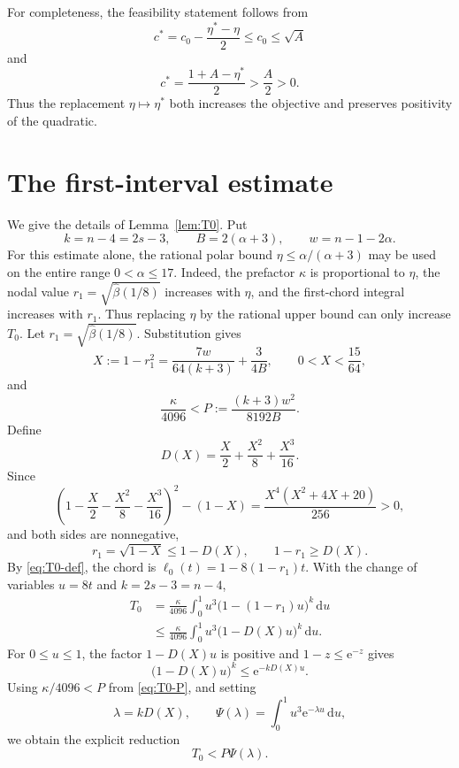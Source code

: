 \documentclass[11pt]{amsart}
\theoremstyle{definition}
\newcommand{\dd}{\,\mathrm d}
\newcommand{\e}{\mathrm e}
\newcommand{\etaStar}{\eta^{\ast}}
\newcommand{\betaHat}{\widehat\beta}
\begin{document}
For completeness, the feasibility statement follows from
\[
 c^{\ast}=c_0-\frac{\etaStar-\eta}{2}\le c_0\le\sqrt A
\]
and
\[
 c^{\ast}=\frac{1+A-\etaStar}{2}>\frac A2>0.
\]
Thus the replacement $\eta\mapsto\etaStar$ both increases the objective and preserves positivity of the quadratic.

\section{The first-interval estimate}\label{app:T0}

We give the details of Lemma~\ref{lem:T0}.  Put
\[
 k=n-4=2s-3,
 \qquad
 B=2(\alpha+3),
 \qquad
 w=n-1-2\alpha.
\]
For this estimate alone, the rational polar bound $\eta\le\alpha/(\alpha+3)$ may be used on the entire range $0<\alpha\le17$.  Indeed, the prefactor $\kappa$ is proportional to $\eta$, the nodal value $r_1=\sqrt{\betaHat(1/8)}$ increases with $\eta$, and the first-chord integral increases with $r_1$.  Thus replacing $\eta$ by the rational upper bound can only increase $T_0$.
Let $r_1=\sqrt{\betaHat(1/8)}$.  Substitution gives
\begin{equation}\label{eq:T0-X}
 X:=1-r_1^2
 =\frac{7w}{64(k+3)}+\frac3{4B},
 \qquad 0<X<\frac{15}{64},
\end{equation}
and
\begin{equation}\label{eq:T0-P}
 \frac\kappa{4096}
 <P:=\frac{(k+3)w^2}{8192B}.
\end{equation}
Define
\[
 D(X)=\frac X2+\frac{X^2}{8}+\frac{X^3}{16}.
\]
Since
\[
 \left(1-\frac X2-\frac{X^2}{8}-\frac{X^3}{16}\right)^2-(1-X)
 =\frac{X^4(X^2+4X+20)}{256}>0,
\]
and both sides are nonnegative,
\[
 r_1=\sqrt{1-X}
 \le 1-D(X),
 \qquad
 1-r_1\ge D(X).
\]
By \eqref{eq:T0-def}, the chord is $\ell_0(t)=1-8(1-r_1)t$.  With the change of variables $u=8t$ and $k=2s-3=n-4$,
\begin{align*}
 T_0
 &=\frac{\kappa}{4096}
   \int_0^1u^3\bigl(1-(1-r_1)u\bigr)^k\dd u\\
 &\le\frac{\kappa}{4096}
   \int_0^1u^3\bigl(1-D(X)u\bigr)^k\dd u.
\end{align*}
For $0\le u\le1$, the factor $1-D(X)u$ is positive and $1-z\le\e^{-z}$ gives
\[
 \bigl(1-D(X)u\bigr)^k
 \le\e^{-kD(X)u}.
\]
Using $\kappa/4096<P$ from \eqref{eq:T0-P}, and setting
\[
 \lambda=kD(X),
 \qquad
 \Psi(\lambda)=\int_0^1u^3\e^{-\lambda u}\dd u,
\]
we obtain the explicit reduction
\begin{equation}\label{eq:T0-Laplace-reduction}
 T_0<P\Psi(\lambda).
\end{equation}
\end{document}
